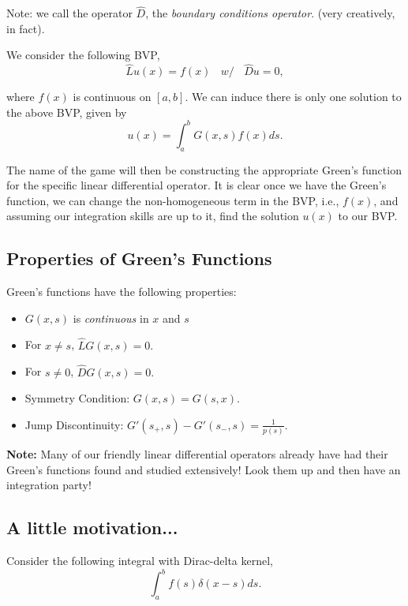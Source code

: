 Note: we call the operator $\hat{D}$, the \emph{boundary conditions operator}. (very creatively, in fact). 

We consider the following BVP,
\begin{equation}
\label{BVP} \hat{L}u(x) = f(x)  \ \ \ \  w/ \ \ \ \  \hat{D} u = 0,
\end{equation}

where $f(x)$ is continuous on $[a,b]$. We can induce there is only one solution to the above BVP, given by 
\begin{equation}
\label{greens_solution} u(x) = \int_a^b G(x,s) f(x) ds.
\end{equation}

The name of the game will then be constructing the appropriate Green's function for the specific linear differential operator. It is clear once we have the Green's function, we can change the non-homogeneous term in the BVP, i.e., $f(x)$, and assuming our integration skills are up to it, find the solution $u(x)$ to our BVP.

\subsection{Properties of Green's Functions}

Green's functions have the following properties:
\begin{itemize}
\item $G(x,s)$ is \emph{continuous} in $x$ and $s$
\item For $x\neq s$, $\hat{L}G(x,s) = 0.$
\item For $s\neq 0$, $\hat{D} G(x,s) = 0.$
\item Symmetry Condition: $G(x,s) = G(s,x)$.
\item Jump Discontinuity: $G'(s_{+},s) - G'(s_{-},s) = \frac{1}{p(s)}.$
\end{itemize}

{\bf{Note:}} Many of our friendly linear differential operators already have had their Green's functions found and studied extensively! Look them up and then have an integration party!

\subsection{A little motivation...}

Consider the following integral with Dirac-delta kernel, 
\begin{equation}
\label{delta_integral} \int_a^b f(s) \delta(x-s) ds.
\end{equation}

